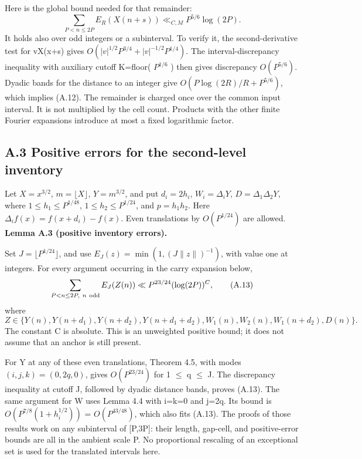 \documentclass[11pt,a4paper]{article}
\begin{document}
Here is the global bound needed for that remainder: \[
\sum_{P<n\le2P}E_R(X(n+s))\ll_{C,M}P^{5/6}\log(2P). \tag{A.12}
\] It holds also over odd integers or a subinterval. To verify it, the
second-derivative test for vX(x+s) gives
\(O(|v|^{1/2}P^{3/4}+|v|^{-1/2}P^{1/4})\). The interval-discrepancy
inequality with auxiliary cutoff K=floor( \(P^{1/6}\) ) then gives
discrepancy \(O(P^{5/6})\). Dyadic bands for the distance to an integer
give \(O(P \log(2R)/R+P^{5/6})\), which implies (A.12). The remainder is
charged once over the common input interval. It is not multiplied by the
cell count. Products with the other finite Fourier expansions introduce
at most a fixed logarithmic factor.

\subsection{A.3 Positive errors for the second-level
inventory}\label{a.3-positive-errors-for-the-second-level-inventory}

Let \(X=x^{3/2}\), \(m=\lfloor X\rfloor\), \(Y=m^{3/2}\), and put
\(d_i=2h_i\), \(W_i=\Delta_iY\), \(D=\Delta_1\Delta_2Y\), where
\(1\le h_1\le P^{1/48}\), \(1\le h_2\le P^{1/24}\), and \(p=h_1h_2\).
Here \(\Delta_i f(x)=f(x+d_i)-f(x)\). Even translations by
\(O(P^{1/24})\) are allowed. \textbf{Lemma A.3 (positive inventory
errors).}

Set \(J=\lfloor P^{1/24}\rfloor\), and use
\(E_J(z)=\min(1,(J\|z\|)^{-1})\), with value one at integers. For every
argument occurring in the carry expansion below, \[
\sum_{P<n\le2P,\ n\ {\rm odd}} E_J(Z(n))
\ll P^{23/24}(\log(2P))^C, \tag{A.13}
\] where \[
Z\in\{Y(n),Y(n+d_1),Y(n+d_2),Y(n+d_1+d_2),
W_1(n),W_2(n),W_1(n+d_2),D(n)\}.
\] The constant C is absolute. This is an unweighted positive bound; it
does not assume that an anchor is still present.

For Y at any of these even translations, Theorem 4.5, with modes
\((i,j,k)=(0,2q,0)\), gives \(O(P^{23/24})\) for 1 \(\le\)
\textbar q\textbar{} \(\le\) J. The discrepancy inequality at cutoff J,
followed by dyadic distance bands, proves (A.13). The same argument for
W uses Lemma 4.4 with i=k=0 and j=2q. Its bound is
\(O(P^{7/8}(1+h_i^{1/2}))\) = \(O(P^{43/48})\), which also fits (A.13).
The proofs of those results work on any subinterval of {[}P,3P{]}: their
length, gap-cell, and positive-error bounds are all in the ambient scale
P. No proportional rescaling of an exceptional set is used for the
translated intervals here.
\end{document}
